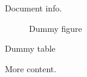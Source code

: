 \documentclass{article}
\begin{document}
Document info.

\begin{figure}
  \caption{Dummy figure}
\end{figure}

\begin{table}
  \caption{Dummy table}
\end{table}

More content.

\begin{appendix}
  \listoffigures
  \listoftables
\end{appendix}
\end{document}
